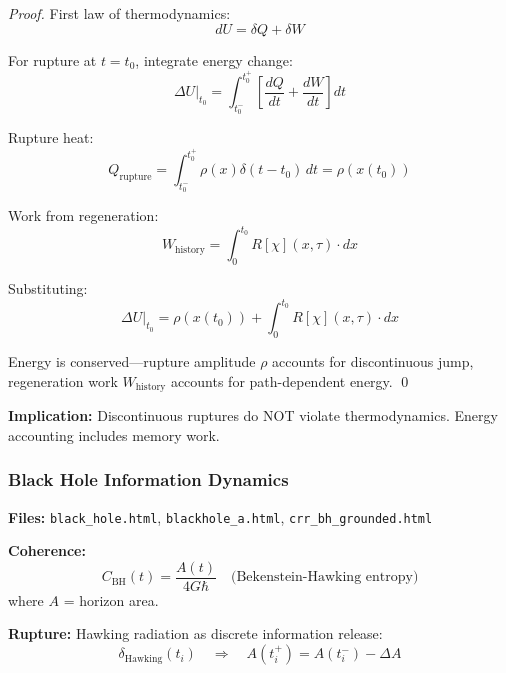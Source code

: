 \documentclass[11pt,a4paper]{article}
\theoremstyle{definition}
\theoremstyle{remark}
\begin{document}
\begin{proof}
First law of thermodynamics:
\begin{equation}
dU = \delta Q + \delta W
\end{equation}

For rupture at $t = t_0$, integrate energy change:
\begin{equation}
\Delta U|_{t_0} = \int_{t_0^-}^{t_0^+} \left[\frac{dQ}{dt} + \frac{dW}{dt}\right] dt
\end{equation}

Rupture heat:
\begin{equation}
Q_{\text{rupture}} = \int_{t_0^-}^{t_0^+} \rho(x) \delta(t-t_0)\,dt = \rho(x(t_0))
\end{equation}

Work from regeneration:
\begin{equation}
W_{\text{history}} = \int_0^{t_0} R[\chi](x,\tau) \cdot dx
\end{equation}

Substituting:
\begin{equation}
\Delta U|_{t_0} = \rho(x(t_0)) + \int_0^{t_0} R[\chi](x,\tau) \cdot dx
\end{equation}

Energy is conserved—rupture amplitude $\rho$ accounts for discontinuous jump, regeneration work $W_{\text{history}}$ accounts for path-dependent energy. \qed
\end{proof}

\textbf{Implication:} Discontinuous ruptures do NOT violate thermodynamics. Energy accounting includes memory work.

\subsubsection{Black Hole Information Dynamics}

\textbf{Files:} \texttt{black\_hole.html}, \texttt{blackhole\_a.html}, \texttt{crr\_bh\_grounded.html}

\textbf{Coherence:}
\begin{equation}
C_{\text{BH}}(t) = \frac{A(t)}{4G\hbar} \quad \text{(Bekenstein-Hawking entropy)}
\end{equation}
where $A$ = horizon area.

\textbf{Rupture:} Hawking radiation as discrete information release:
\begin{equation}
\delta_{\text{Hawking}}(t_i) \quad \Rightarrow \quad A(t_i^+) = A(t_i^-) - \Delta A
\end{equation}
\end{document}

